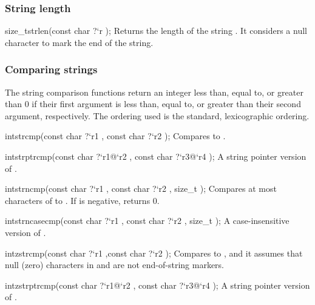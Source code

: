 \subsubsection*{String length}
\begin{defun2}{size_t}{strlen}{(const char {?}`r );}
  Returns the length of the string .  It considers a null
  character to mark the end of the string.
\end{defun2}

\subsubsection*{Comparing strings}
The string comparison functions return an integer less than, equal to,
or greater than 0 if their first argument is less than, equal to, or
greater than their second argument, respectively.  The ordering used
is the standard, lexicographic ordering.

\begin{defun2}{int}{strcmp}{(const char {?}`r1 , const char {?}`r2 );}
  Compares  to .
\end{defun2}

\begin{defun2}{int}{strptrcmp}{(const char {?}`r1@`r2 , const char {?}`r3@`r4 );}
  A string pointer version of .
\end{defun2}

\begin{defun2}{int}{strncmp}{(const char {?}`r1 , const char {?}`r2 , size_t );}
  Compares at most  characters of  to .  If
   is negative,  returns 0.
\end{defun2}

\begin{defun2}{int}{strncasecmp}{(const char {?}`r1 , const char {?}`r2 , size_t );}
  A case-insensitive version of .
\end{defun2}

\begin{defun2}{int}{zstrcmp}{(const char {?}`r1 ,const char {?}`r2 );}
  Compares  to , and it assumes that null (zero)
  characters in  and  are not end-of-string markers.
\end{defun2}

\begin{defun2}{int}{zstrptrcmp}{(const char {?}`r1@`r2 , const char {?}`r3@`r4 );}
  A string pointer version of .
\end{defun2}

